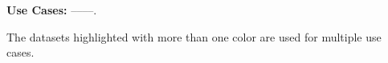 \begin{table*}[tp]
{\begin{threeparttable}
\begin{tabular}{l c l c c c}
        \bottomrule
    \end{tabular}
    \begin{tablenotes}[flushleft]
    \footnotesize
    \item \textbf{Use Cases:} --------. 
    \item
    The datasets highlighted with more than one color are used for multiple use cases.
    \end{tablenotes}
\end{threeparttable}
}
\end{table*}